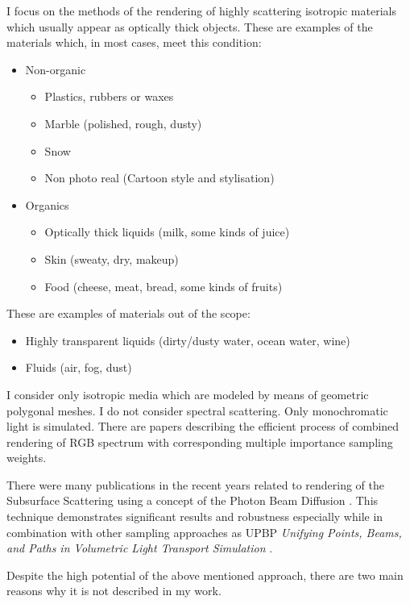 I focus on the methods of the rendering of highly scattering isotropic materials which usually
appear as optically thick objects. These are examples of the materials which, in most cases, meet
this condition:
\begin{itemize}
    \item Non-organic
    \begin{itemize}
        \item Plastics, rubbers or waxes
        \item Marble (polished, rough, dusty)
        \item Snow
        \item Non photo real (Cartoon style and stylisation)
    \end{itemize}
    \item Organics
    \begin{itemize}
    \item Optically thick liquids (milk, some kinds of juice)
        \item Skin (sweaty, dry, makeup)
        \item Food (cheese, meat, bread, some kinds of fruits)
    \end{itemize}
\end{itemize}
These are examples of materials out of the scope:
\begin{itemize}
    \item Highly transparent liquids (dirty/dusty water, ocean water, wine)
    \item Fluids (air, fog, dust)
\end{itemize}
I consider only isotropic media which are modeled by means of geometric
polygonal meshes. I do not consider spectral scattering. Only monochromatic light is simulated.
There are papers describing the efficient process of combined rendering of RGB spectrum with
corresponding multiple importance sampling weights.

There were many publications in the recent years related to rendering of the Subsurface Scattering
using a concept of the Photon Beam Diffusion \cite{Habel:2013:PBD:2600890.2600896}. This technique
demonstrates significant results and robustness especially while in combination with other
sampling approaches as UPBP \emph{Unifying Points, Beams, and Paths in Volumetric Light Transport
Simulation} \cite{krivanek14upbp}.

Despite the high potential of the above mentioned approach, there are two main reasons why it is not
described in my work.

